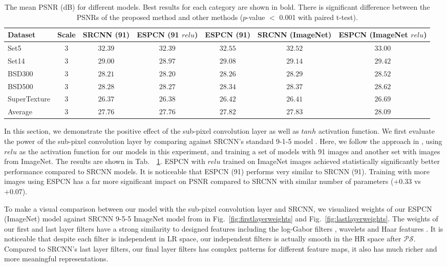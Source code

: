 \documentclass[10pt,twocolumn,letterpaper]{article}
\newcommand{\periodicshufflingoperator}[0]{\mathcal{PS}}
\begin{document}
\begin{table}
\footnotesize
\begin{center}
\begin{tabular}{|l|c|c|c|c|c|c|}
\hline
Dataset & Scale & SRCNN (91) & ESPCN (91 $relu$) & ESPCN (91) & SRCNN (ImageNet) & ESPCN (ImageNet $relu$) \\
\hline\hline
Set5 & 3 & $32.39$ & $32.39$ & $32.55$ & $32.52$ & $\mathbf{33.00}$ \\
Set14 & 3 & $29.00$ & $28.97$ & $29.08$ & $29.14$ & $\mathbf{29.42}$ \\
BSD300 & 3 & $28.21$ & $28.20$ & $28.26$ & $28.29$ & $\mathbf{28.52}$ \\
BSD500 & 3 & $28.28$ & $28.27$ & $28.34$ & $28.37$ & $\mathbf{28.62}$ \\
SuperTexture & 3 & $26.37$ & $26.38$ & $26.42$ & $26.41$ & $\mathbf{26.69}$ \\
\hline\hline
Average & 3 & $27.76$ & $27.76$ & $27.82$ & $27.83$ & $\mathbf{28.09}$ \\
\hline
\end{tabular}
\end{center}
\caption{The mean PSNR (dB) for different models. Best results for each category are shown in bold. There is significant difference between the \acp{PSNR} of the proposed method and other methods ($p$-value $<$ 0.001 with paired t-test).}
\label{tab:componentsresult}
\end{table}

In this section, we demonstrate the positive effect of the sub-pixel convolution layer as well as $tanh$ activation function. We first evaluate the power of the sub-pixel convolution layer by comparing against SRCNN's standard 9-1-5 model \cite{dong2014learning}. Here, we follow the approach in \cite{dong2014learning}, using $relu$ as the activation function for our models in this experiment, and training a set of models with 91 images and another set with images from ImageNet. The results are shown in Tab.~~\ref{tab:componentsresult}. \ac{ESPCN} with $relu$ trained on ImageNet images achieved statistically significantly better performance compared to SRCNN models. It is noticeable that \ac{ESPCN} (91) performs very similar to SRCNN (91). Training with more images using \ac{ESPCN} has a far more significant impact on \ac{PSNR} compared to SRCNN with similar number of parameters (+0.33 vs +0.07).

To make a visual comparison between our model with the sub-pixel convolution layer and SRCNN, we visualized weights of our ESPCN (ImageNet) model against SRCNN 9-5-5 ImageNet model from \cite{dong2015image} in Fig.~\ref{fig:firstlayerweights} and Fig.~\ref{fig:lastlayerweights}. The weights of our first and last layer filters have a strong similarity to designed features including the log-Gabor filters \cite{yao2006iris}, wavelets \cite{kingsbury2001complex} and Haar features \cite{viola2001rapid}. It is noticeable that despite each filter is independent in \ac{LR} space, our independent filters is actually smooth in the \ac{HR} space after $\periodicshufflingoperator$. Compared to SRCNN's last layer filters, our final layer filters has complex patterns for different feature maps, it also has much richer and more meaningful representations.
\end{document}
